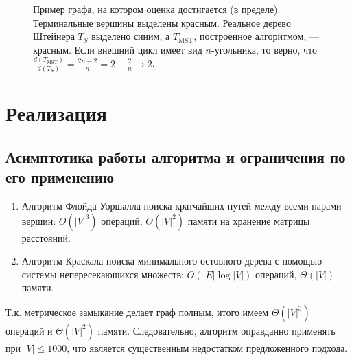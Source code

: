 \documentclass[11pt,a4paper]{report}
\def\le{\leqslant}
\theoremstyle{definition}
\theoremstyle{definition}
\theoremstyle{definition}
\begin{document}
	\begin{figure}[!hbtp]
	\centering
		\caption{  Пример графа, на котором оценка достигается (в пределе). Терминальные вершины выделены красным. Реальное дерево Штейнера $ T_{S} $ выделено синим, а $ T_{\mathrm{MST}} $, построенное алгоритмом, — красным. Если внешний цикл имеет вид $n$-угольника, то верно, что $ \frac{d(T_{\mathrm{MST}})}{d(T_{S})} = \frac{2n-2}{n} = 2 - \frac{2}{n} \to 2 $. } 
	\end{figure}
	\section{Реализация}
	\subsection{Асимптотика работы алгоритма и ограничения по его применению}
	\begin{enumerate}
		\item Алгоритм Флойда-Уоршалла поиска кратчайших путей между всеми парами вершин: $\Theta(|V|^3)$ операций, $ \Theta(|V|^2) $ памяти на хранение матрицы расстояний. 
		\item Алгоритм Краскала поиска минимального остовного дерева с помощью системы непересекающихся множеств: $O(|E| \log |V|)$ операций, $ \Theta(|V|) $ памяти. 
	\end{enumerate}
	Т.к. метрическое замыкание делает граф полным, итого имеем $ \Theta(|V|^3) $ операций и $\Theta(|V|^2)$ памяти. Следовательно, алгоритм оправданно применять при $ |V| \le 1000 $, что является существенным недостатком предложенного подхода.\\
	
\end{document}

